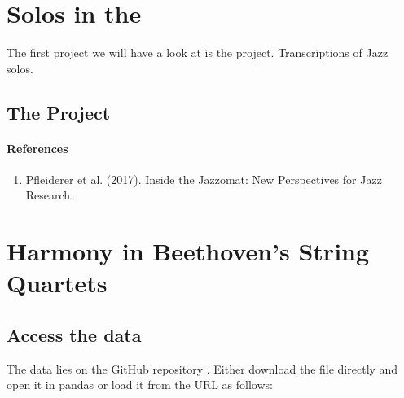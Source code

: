 \documentclass[letterpaper,10pt,english]{sphinxmanual}
\begin{document}
\chapter{Solos in the }
\label{\detokenize{jazz_solos:solos-in-the-weimar-jazz-database}}\label{\detokenize{jazz_solos::doc}}
The first project we will have a look at is the  project.
Transcriptions of Jazz solos.


\section{The Project}
\label{\detokenize{jazz_solos:the-project}}\subsubsection*{References}
\begin{enumerate}
%
\item {} 
Pfleiderer et al. (2017). Inside the Jazzomat: New Perspectives for Jazz Research.

\end{enumerate}


\chapter{Harmony in Beethoven’s String Quartets}
\label{\detokenize{beethoven_harmony:harmony-in-beethoven-s-string-quartets}}\label{\detokenize{beethoven_harmony::doc}}

\section{Access the data}
\label{\detokenize{beethoven_harmony:access-the-data}}
The data lies on the GitHub repository .
Either download the  file directly and open it in pandas or load it from the URL as follows:

\begin{sphinxVerbatim}[commandchars=\\\{\}]
   

   
\end{sphinxVerbatim}
\end{document}
